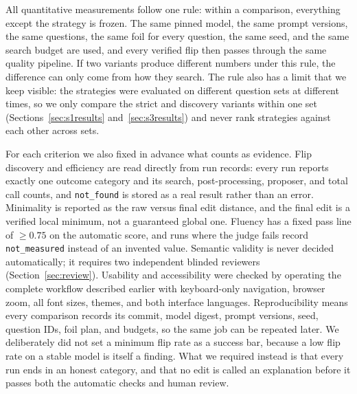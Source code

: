 \documentclass[11pt,a4paper]{article}
\begin{document}
All quantitative measurements follow one rule: within a comparison, everything except
the strategy is frozen. The same pinned model, the same prompt versions, the same
questions, the same foil for every question, the same seed, and the same search
budget are used, and every verified flip then passes through the same quality
pipeline. If two variants produce different numbers under this rule, the difference
can only come from how they search. The rule also has a limit that we keep visible:
the strategies were evaluated on different question sets at different times, so we
only compare the strict and discovery variants within one set
(Sections~\ref{sec:s1results} and~\ref{sec:s3results}) and never rank strategies
against each other across sets.

For each criterion we also fixed in advance what counts as evidence. Flip discovery
and efficiency are read directly from run records: every run reports exactly one
outcome category and its search, post-processing, proposer, and total call counts,
and \texttt{not\_found} is stored as a real result rather than an error. Minimality
is reported as the raw versus final edit distance, and the final edit is a verified
local minimum, not a guaranteed global one. Fluency has a fixed pass line of
$\geq 0.75$ on the automatic score, and runs where the judge fails record
\texttt{not\_measured} instead of an invented value. Semantic validity is never
decided automatically; it requires two independent blinded reviewers
(Section~\ref{sec:review}). Usability and accessibility were checked by operating the
complete workflow described earlier with keyboard-only navigation, browser zoom, all
font sizes, themes, and both interface languages. Reproducibility means every
comparison records its commit, model digest, prompt versions, seed, question IDs,
foil plan, and budgets, so the same job can be repeated later. We deliberately did
not set a minimum flip rate as a success bar, because a low flip rate on a stable
model is itself a finding. What we required instead is that every run ends in an
honest category, and that no edit is called an explanation before it passes both the
automatic checks and human review.
\end{document}
